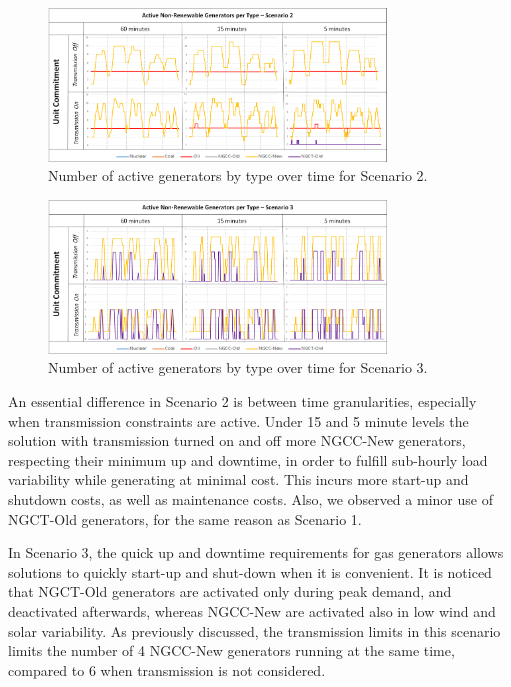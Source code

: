 \documentclass[12pt,LUDisStyle,twosided]{book}
\begin{document}
  \begin{figure}[H] 
  \centering
  
	  \includegraphics[width=0.8\textwidth,keepaspectratio]{activeGeneratorsS2.png}
  
  \caption{Number of active generators by type over time for Scenario 2.}
  \label{fig:activeGeneratorsS2}
  
\end{figure}


\begin{figure}[H] 
  \centering
  
	  \includegraphics[width=0.8\textwidth,keepaspectratio]{activeGeneratorsS3.png}
  
  \caption{Number of active generators by type over time for Scenario 3.}
  \label{fig:activeGeneratorsS3}
  
\end{figure}

An essential difference in Scenario 2 is between time granularities, especially when transmission constraints are active. Under 15 and 5 minute levels the solution with transmission turned on and off more NGCC-New generators, respecting their minimum up and downtime, in order to fulfill sub-hourly load variability while generating at minimal cost. This incurs more start-up and shutdown costs, as well as maintenance costs. Also, we observed a minor use of NGCT-Old generators, for the same reason as Scenario 1.

In Scenario 3, the quick up and downtime requirements for gas generators allows solutions to quickly start-up and shut-down when it is convenient. It is noticed that NGCT-Old generators are activated only during peak demand, and deactivated afterwards, whereas NGCC-New are activated also in low wind and solar variability. As previously discussed, the transmission limits in this scenario limits the number of 4 NGCC-New generators running at the same time, compared to 6 when transmission is not considered.
\end{document}
